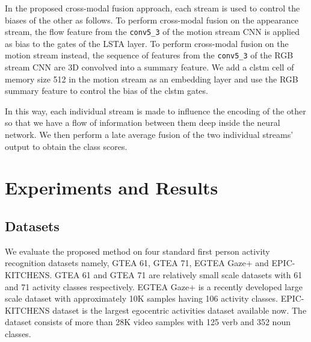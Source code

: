 \documentclass[10pt,twocolumn,letterpaper]{article}
\begin{document}
\begin{matrix*}[r]
    In the proposed cross-modal fusion approach, each stream is used to control the biases of the other as follows. To perform cross-modal fusion on the appearance stream, the flow feature from the \verb+conv5_3+ of the motion stream CNN is applied as bias to the gates of the LSTA layer. To perform cross-modal fusion on the motion stream instead, the sequence of features from the \verb+conv5_3+ of the RGB stream CNN are 3D convolved into a summary feature. We add a \ac{clstm} cell of memory size 512 in the motion stream as an embedding layer and use the RGB summary feature to control the bias of the \ac{clstm} gates. 
    


    In this way, each individual stream is made to influence the encoding of the other so that we have a flow of information between them deep inside the neural network. We then perform a late average fusion of the two individual streams' output to obtain the class scores. 





\section{Experiments and Results}
\label{sec:results}
\vspace{-0.1cm}
\subsection{Datasets}
\vspace{-0.1cm}
	We evaluate the proposed method on four standard first person activity recognition datasets namely, GTEA 61, GTEA 71, EGTEA Gaze+ and EPIC-KITCHENS. GTEA 61 and GTEA 71 are relatively small scale datasets with 61 and 71 activity classes respectively. EGTEA Gaze+ is a recently developed large scale dataset with approximately 10K samples having 106 activity classes. EPIC-KITCHENS dataset is the largest egocentric activities dataset available now. The dataset consists of more than 28K video samples with 125 verb and 352 noun classes.


\end{matrix*}
\end{document}
